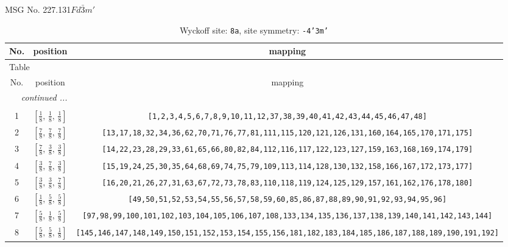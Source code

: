 \documentclass[fleqn,8pt]{jsarticle}
\begin{document}
\setcounter{MaxMatrixCols}{32}

\renewcommand{\tablename}{Table~}
\renewcommand{\figurename}{Figure~}
\begin{center}
\LARGE
MSG No. 227.131\quad$Fd\bar{3}m'$
\end{center}
\renewcommand{\arraystretch}{1.2}
\begin{longtable}{ccc}
\caption{Wyckoff site: {\tt 8a}, site symmetry: {\tt -4'3m'}}
 \\
 \hline \hline
No. & position & mapping \\ \hline \endfirsthead

\multicolumn{2}{l}{\tablename\ \thetable{}} \\
 \hline \hline
No. & position & mapping \\ \hline \endhead

 \hline \hline
\multicolumn{2}{r}{\footnotesize\it continued ...} \\ \endfoot

 \hline \hline
\multicolumn{2}{r}{} \\ \endlastfoot

1 & $\left[ \frac{1}{8},\, \frac{1}{8},\, \frac{1}{8} \right]$ & {\tt [1,2,3,4,5,6,7,8,9,10,11,12,37,38,39,40,41,42,43,44,45,46,47,48]} \\ \hline
2 & $\left[ \frac{7}{8},\, \frac{7}{8},\, \frac{7}{8} \right]$ & {\tt [13,17,18,32,34,36,62,70,71,76,77,81,111,115,120,121,126,131,160,164,165,170,171,175]} \\ \hline
3 & $\left[ \frac{7}{8},\, \frac{3}{8},\, \frac{3}{8} \right]$ & {\tt [14,22,23,28,29,33,61,65,66,80,82,84,112,116,117,122,123,127,159,163,168,169,174,179]} \\ \hline
4 & $\left[ \frac{3}{8},\, \frac{7}{8},\, \frac{3}{8} \right]$ & {\tt [15,19,24,25,30,35,64,68,69,74,75,79,109,113,114,128,130,132,158,166,167,172,173,177]} \\ \hline
5 & $\left[ \frac{3}{8},\, \frac{3}{8},\, \frac{7}{8} \right]$ & {\tt [16,20,21,26,27,31,63,67,72,73,78,83,110,118,119,124,125,129,157,161,162,176,178,180]} \\ \hline
6 & $\left[ \frac{1}{8},\, \frac{5}{8},\, \frac{5}{8} \right]$ & {\tt [49,50,51,52,53,54,55,56,57,58,59,60,85,86,87,88,89,90,91,92,93,94,95,96]} \\ \hline
7 & $\left[ \frac{5}{8},\, \frac{1}{8},\, \frac{5}{8} \right]$ & {\tt [97,98,99,100,101,102,103,104,105,106,107,108,133,134,135,136,137,138,139,140,141,142,143,144]} \\ \hline
8 & $\left[ \frac{5}{8},\, \frac{5}{8},\, \frac{1}{8} \right]$ & {\tt [145,146,147,148,149,150,151,152,153,154,155,156,181,182,183,184,185,186,187,188,189,190,191,192]} \\
\end{longtable}
\end{document}
